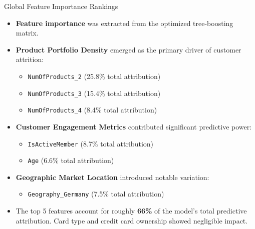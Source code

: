 \begin{frame}{Global Feature Importance Rankings}
\scriptsize
\begin{itemize}
    \item \textbf{Feature importance} was extracted from the optimized tree-boosting matrix.
    \item \textbf{Product Portfolio Density} emerged as the primary driver of customer attrition:
    \begin{itemize}
        \item \texttt{NumOfProducts\_2} (25.8\% total attribution)
        \item \texttt{NumOfProducts\_3} (15.4\% total attribution)
        \item \texttt{NumOfProducts\_4} (8.4\% total attribution)
    \end{itemize}
    \item \textbf{Customer Engagement Metrics} contributed significant predictive power:
    \begin{itemize}
        \item \texttt{IsActiveMember} (8.7\% total attribution)
        \item \texttt{Age} (6.6\% total attribution)
    \end{itemize}
    \item \textbf{Geographic Market Location} introduced notable variation:
    \begin{itemize}
        \item \texttt{Geography\_Germany} (7.5\% total attribution)
    \end{itemize}
    \item The top 5 features account for roughly \textbf{66\%} of the model's total predictive attribution. Card type and credit card ownership showed negligible impact.
\end{itemize}
\end{frame}

